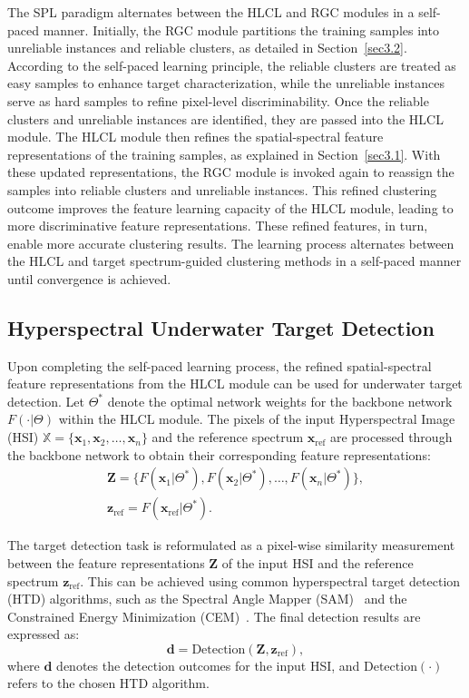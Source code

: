 The SPL paradigm alternates between the HLCL and RGC modules in a self-paced manner. Initially, the RGC module partitions the training samples into unreliable instances and reliable clusters, as detailed in Section~\ref{sec3.2}. According to the self-paced learning principle, the reliable clusters are treated as easy samples to enhance target characterization, while the unreliable instances serve as hard samples to refine pixel-level discriminability. Once the reliable clusters and unreliable instances are identified, they are passed into the HLCL module. The HLCL module then refines the spatial-spectral feature representations of the training samples, as explained in Section~\ref{sec3.1}. With these updated representations, the RGC module is invoked again to reassign the samples into reliable clusters and unreliable instances. This refined clustering outcome improves the feature learning capacity of the HLCL module, leading to more discriminative feature representations. These refined features, in turn, enable more accurate clustering results. The learning process alternates between the HLCL and target spectrum-guided clustering methods in a self-paced manner until convergence is achieved.

\subsection{Hyperspectral Underwater Target Detection}\label{sec3.4}
Upon completing the self-paced learning process, the refined spatial-spectral feature representations from the HLCL module can be used for underwater target detection. Let $\Theta^{\ast}$ denote the optimal network weights for the backbone network $F(\cdot|\Theta)$ within the HLCL module. The pixels of the input Hyperspectral Image (HSI) $\mathbb{X} = \{\bm{x}_1, \bm{x}_2, \dots, \bm{x}_n\}$ and the reference spectrum $\bm{x}_{\text{ref}}$ are processed through the backbone network to obtain their corresponding feature representations:
\begin{equation}
    \begin{gathered}
        \bm{Z} = \{F(\bm{x}_1|\Theta^{\ast }), F(\bm{x}_2|\Theta^{\ast }), \dots, F(\bm{x}_n|\Theta^{\ast })\}, \\
        \bm{z}_{\text{ref}} = F(\bm{x}_{\text{ref}}|\Theta^{\ast }).
    \end{gathered}
\end{equation}

The target detection task is reformulated as a pixel-wise similarity measurement between the feature representations $\bm{Z}$ of the input HSI and the reference spectrum $\bm{z}_{\text{ref}}$. This can be achieved using common hyperspectral target detection (HTD) algorithms, such as the Spectral Angle Mapper (SAM)~\cite{KRUSE1993145} and the Constrained Energy Minimization (CEM)~\cite{Manolakis2002}. The final detection results are expressed as:
\begin{equation}
    \bm{d} = \text{Detection}(\bm{Z}, \bm{z}_{\text{ref}}),
\end{equation}
where $\bm{d}$ denotes the detection outcomes for the input HSI, and $\text{Detection}(\cdot)$ refers to the chosen HTD algorithm.
